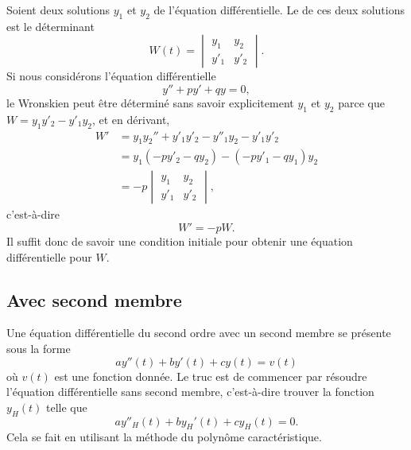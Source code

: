 Soient deux solutions \( y_1\) et \( y_2\) de l'équation différentielle. Le  de ces deux solutions est le déterminant
\begin{equation}
	W(t)=\begin{vmatrix}
		y_1  & y_2  \\
		y'_1 & y'_2
	\end{vmatrix}.
\end{equation}
Si nous considérons l'équation différentielle
\begin{equation}
	y''+py'+qy=0,
\end{equation}
le Wronskien peut être déterminé sans savoir explicitement \( y_1\) et \( y_2\) parce que \( W=y_1y'_2-y'_1y_2\), et en dérivant,
\begin{subequations}
	\begin{align}
		W' & =y_1y_2''+y'_1y'_2-y''_1y_2-y'_1y'_2 \\
		   & =y_1(-py'_2-qy_2)-(-py'_1-qy_1)y_2   \\
		   & =-p\begin{vmatrix}
			        y_1  & y_2  \\
			        y'_1 & y'_2
		        \end{vmatrix},
	\end{align}
\end{subequations}
c'est-à-dire
\begin{equation}    \label{EqHEMRgM}
	W'=-pW.
\end{equation}
Il suffit donc de savoir une condition initiale pour obtenir une équation différentielle pour \( W\).

\subsection{Avec second membre}

Une équation différentielle du second ordre avec un second membre se présente sous la forme
\begin{equation}
	ay''(t)+by'(t)+cy(t)=v(t)
\end{equation}
où \( v(t)\) est une fonction donnée. Le truc est de commencer par résoudre l'équation différentielle sans second membre, c'est-à-dire trouver la fonction \( y_H(t)\) telle que
\begin{equation}
	ay''_H(t)+by_H'(t)+cy_H(t)=0.
\end{equation}
Cela se fait en utilisant la méthode du polynôme caractéristique.

